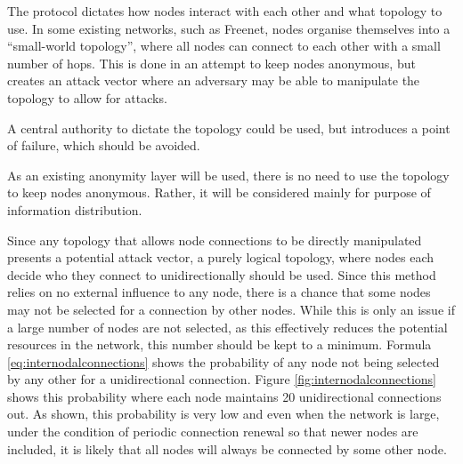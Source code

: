 			
			
			The protocol dictates how nodes interact with each other and what topology to use. In some existing networks, such as Freenet, nodes organise themselves into a ``small-world topology'', where all nodes can connect to each other with a small number of hops. This is done in an attempt to keep nodes anonymous, but creates an attack vector where an adversary may be able to manipulate the topology to allow for attacks.
			
			A central authority to dictate the topology could be used, but introduces a point of failure, which should be avoided.
			
			As an existing anonymity layer will be used, there is no need to use the topology to keep nodes anonymous. Rather, it will be considered mainly for purpose of information distribution. 
			
			Since any topology that allows node connections to be directly manipulated presents a potential attack vector, a purely logical topology, where nodes each decide who they connect to unidirectionally should be used. Since this method relies on no external influence to any node, there is a chance that some nodes may not be selected for a connection by other nodes. While this is only an issue if a large number of nodes are not selected, as this effectively reduces the potential resources in the network, this number should be kept to a minimum. Formula \ref{eq:internodalconnections} shows the probability of any node not being selected by any other for a unidirectional connection. Figure \ref{fig:internodalconnections} shows this probability where each node maintains 20 unidirectional connections out. As shown, this probability is very low and even when the network is large, under the condition of periodic connection renewal so that newer nodes are included, it is likely that all nodes will always be connected by some other node.
			
